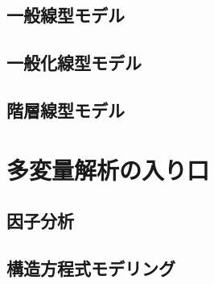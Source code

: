 \documentclass[
  a4paper,
]{ltjsbook}
\begin{document}
\hypertarget{ux4e00ux822cux7ddaux578bux30e2ux30c7ux30eb}{%
\section{一般線型モデル}\label{ux4e00ux822cux7ddaux578bux30e2ux30c7ux30eb}}

\hypertarget{ux4e00ux822cux5316ux7ddaux578bux30e2ux30c7ux30eb}{%
\section{一般化線型モデル}\label{ux4e00ux822cux5316ux7ddaux578bux30e2ux30c7ux30eb}}

\hypertarget{ux968eux5c64ux7ddaux578bux30e2ux30c7ux30eb}{%
\section{階層線型モデル}\label{ux968eux5c64ux7ddaux578bux30e2ux30c7ux30eb}}


\hypertarget{ux591aux5909ux91cfux89e3ux6790ux306eux5165ux308aux53e3}{%
\chapter{多変量解析の入り口}\label{ux591aux5909ux91cfux89e3ux6790ux306eux5165ux308aux53e3}}

\hypertarget{ux56e0ux5b50ux5206ux6790}{%
\section{因子分析}\label{ux56e0ux5b50ux5206ux6790}}

\hypertarget{ux69cbux9020ux65b9ux7a0bux5f0fux30e2ux30c7ux30eaux30f3ux30b0}{%
\section{構造方程式モデリング}\label{ux69cbux9020ux65b9ux7a0bux5f0fux30e2ux30c7ux30eaux30f3ux30b0}}


\printbibliography
\end{document}
